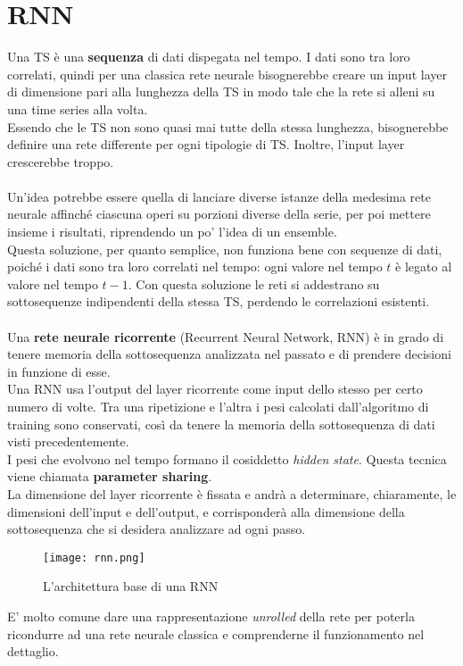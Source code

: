 \section{RNN}
Una TS è una \textbf{sequenza} di dati dispegata nel tempo. I dati sono tra loro correlati, quindi per una classica rete neurale bisognerebbe creare un input layer di dimensione pari alla lunghezza della TS in modo tale che la rete si alleni su una time series alla volta.\\
Essendo che le TS non sono quasi mai tutte della stessa lunghezza, bisognerebbe definire una rete differente per ogni tipologie di TS. Inoltre, l'input layer crescerebbe troppo.\\
\\
Un'idea potrebbe essere quella di lanciare diverse istanze della medesima rete neurale affinché ciascuna operi su porzioni diverse della serie, per poi mettere insieme i risultati, riprendendo un po' l'idea di un ensemble. \\
Questa soluzione, per quanto semplice, non funziona bene con sequenze di dati, poiché i dati sono tra loro correlati nel tempo: ogni valore nel tempo $t$ è legato al valore nel tempo $t-1$. Con questa soluzione le reti si addestrano su sottosequenze indipendenti della stessa TS, perdendo le correlazioni esistenti.\\
\\
Una \textbf{rete neurale ricorrente} (Recurrent Neural Network, RNN) è in grado di tenere memoria della sottosequenza analizzata nel passato e di prendere decisioni in funzione di esse.\\
Una RNN usa l'output del layer ricorrente come input dello stesso per certo numero di volte. Tra una ripetizione e l'altra i pesi calcolati dall'algoritmo di training sono conservati, così da tenere la memoria della sottosequenza di dati visti precedentemente.\\
I pesi che evolvono nel tempo formano il cosiddetto \textit{hidden state}. Questa tecnica viene chiamata \textbf{parameter sharing}.\\
La dimensione del layer ricorrente è fissata e andrà a determinare, chiaramente, le dimensioni dell'input e dell'output, e corrisponderà alla dimensione della sottosequenza che si desidera analizzare ad ogni passo.
\begin{figure}[H]
	\centering
	\texttt{[image: rnn.png]}
	\caption{L'architettura base di una RNN}
	\label{fig:rnn}
\end{figure}
E' molto comune dare una rappresentazione \textit{unrolled} della rete per poterla ricondurre ad una rete neurale classica e comprenderne il funzionamento nel dettaglio.
